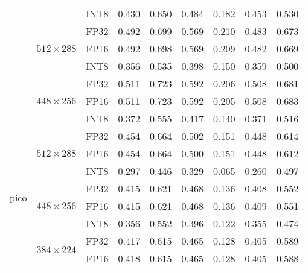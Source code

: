 \begin{appendices}
\begin{table}[t]
\begin{tabular}{|c|c|c|rrrrrr|}
                                    &                                  & INT8 & 0.430 & 0.650 & 0.484 & 0.182 & 0.453 & 0.530 \\
        \cline{2-9}
                                    & \multirow{3}{*}{$512\times288$}  & FP32 & 0.492 & 0.699 & 0.569 & 0.210 & 0.483 & 0.673 \\
                                    &                                  & FP16 & 0.492 & 0.698 & 0.569 & 0.209 & 0.482 & 0.669 \\
                                    &                                  & INT8 & 0.356 & 0.535 & 0.398 & 0.150 & 0.359 & 0.500 \\
        \cline{2-9}
                                    & \multirow{3}{*}{$448\times256$}  & FP32 & 0.511 & 0.723 & 0.592 & 0.206 & 0.508 & 0.681 \\
                                    &                                  & FP16 & 0.511 & 0.723 & 0.592 & 0.205 & 0.508 & 0.683 \\
                                    &                                  & INT8 & 0.372 & 0.555 & 0.417 & 0.140 & 0.371 & 0.516 \\
        \hline
        \multirow{9}{*}{pico}       & \multirow{3}{*}{$512\times288$}  & FP32 & 0.454 & 0.664 & 0.502 & 0.151 & 0.448 & 0.614 \\
                                    &                                  & FP16 & 0.454 & 0.664 & 0.500 & 0.151 & 0.448 & 0.612 \\
                                    &                                  & INT8 & 0.297 & 0.446 & 0.329 & 0.065 & 0.260 & 0.497 \\
        \cline{2-9}
                                    & \multirow{3}{*}{$448\times256$}  & FP32 & 0.415 & 0.621 & 0.468 & 0.136 & 0.408 & 0.552 \\
                                    &                                  & FP16 & 0.415 & 0.621 & 0.468 & 0.136 & 0.409 & 0.551 \\
                                    &                                  & INT8 & 0.356 & 0.552 & 0.396 & 0.122 & 0.355 & 0.474 \\
        \cline{2-9}
                                    & \multirow{3}{*}{$384\times224$}  & FP32 & 0.417 & 0.615 & 0.465 & 0.128 & 0.405 & 0.589 \\
                                    &                                  & FP16 & 0.418 & 0.615 & 0.465 & 0.128 & 0.405 & 0.588 \\

\end{tabular}
\end{table}
\end{appendices}
